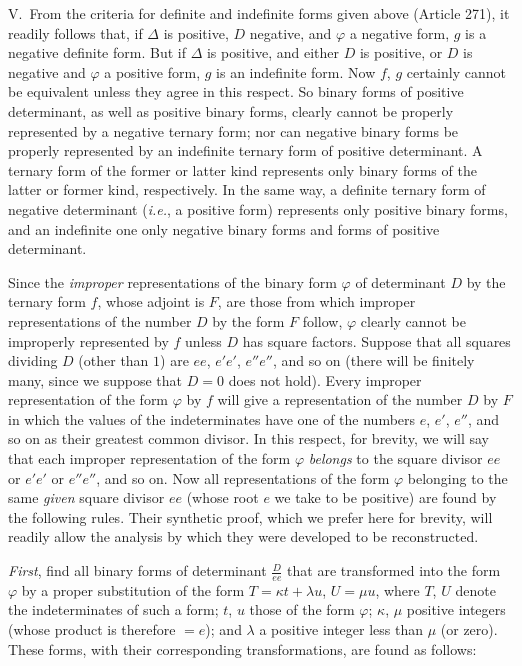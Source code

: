 V.\ From the criteria for definite and indefinite forms given above
(Article 271), it readily follows that, if $\Delta$ is positive, $D$
negative, and $\varphi$ a negative form, $g$ is a negative definite
form. But if $\Delta$ is positive, and either $D$ is positive, or
$D$ is negative and $\varphi$ a positive form, $g$ is an indefinite
form. Now $f$, $g$ certainly cannot be equivalent unless they
agree in this respect. So binary forms of positive determinant, as well
as positive binary forms, clearly cannot be properly represented by a
negative ternary form; nor can negative binary forms be properly represented
by an indefinite ternary form of positive determinant. A ternary form of
the former or latter kind represents only binary forms of the latter or
former kind, respectively. In the same way, a definite ternary form of
negative determinant (\textit{i.e.}, a positive form) represents only
positive binary forms, and an indefinite one only negative binary forms
and forms of positive determinant.

Since the \textit{improper} representations of the binary form $\varphi$
of determinant $D$ by the ternary form $f$, whose adjoint is
$F$, are those from which improper representations
of the number $D$ by the form $F$ follow, $\varphi$ clearly cannot
be improperly represented by $f$ unless $D$ has square factors.
Suppose that all squares dividing $D$ (other than $1$) are
$ee$, $e'e'$, $e''e''$, and so on (there will be finitely many,
since we suppose that $D=0$ does not hold). Every improper representation
of the form $\varphi$ by $f$ will give a representation of the number
$D$ by $F$ in which the values of the indeterminates have one
of the numbers $e$, $e'$, $e''$, and so on as their greatest
common divisor. In this respect, for brevity, we will say that each
improper representation of the form $\varphi$ \textit{belongs} to the square
divisor $ee$ or $e'e'$ or $e''e''$, and so on. Now all representations
of the form $\varphi$ belonging to the same \textit{given} square divisor
$ee$ (whose root $e$ we take to be positive) are found by the
following rules. Their synthetic proof, which we prefer here for brevity,
will readily allow the analysis by which they were developed to be reconstructed.

\textit{First}, find all binary forms of determinant $\frac{D}{ee}$ that are
transformed into the form $\varphi$ by a proper substitution of the form
$T=\kappa t+\lambda u$, $U=\mu u$, where $T$, $U$ denote the indeterminates of
such a form; $t$, $u$ those of the form $\varphi$; $\kappa$,
$\mu$ positive integers (whose product is therefore $=e$); and
$\lambda$ a positive integer less than $\mu$ (or zero). These forms,
with their corresponding transformations, are found as follows:

